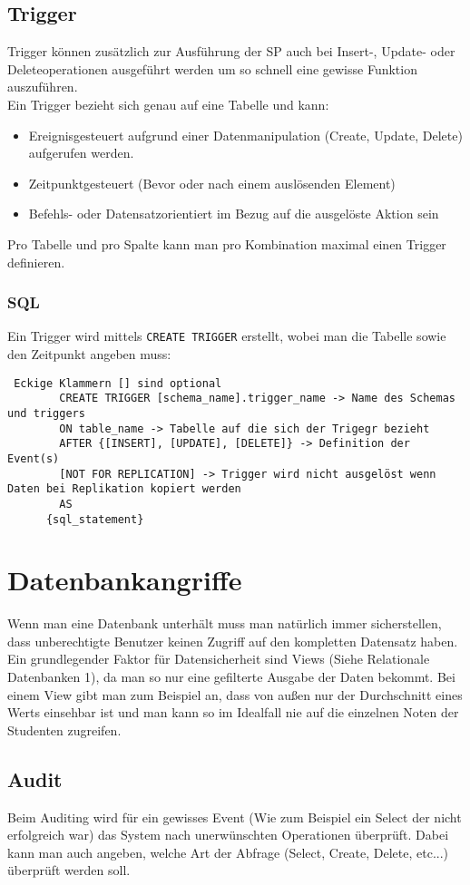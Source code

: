 \documentclass{article}
\begin{document}
	 \subsection{Trigger}
	 Trigger können zusätzlich zur Ausführung der SP auch bei Insert-, Update- oder Deleteoperationen ausgeführt werden um so schnell eine gewisse Funktion auszuführen. \\
	 Ein Trigger bezieht sich genau auf eine Tabelle und kann:
	 \begin{itemize}
	  	\item{Ereignisgesteuert aufgrund einer Datenmanipulation (Create, Update, Delete) aufgerufen werden.}
	  	\item{Zeitpunktgesteuert (Bevor oder nach einem auslösenden Element)}
	  	\item{Befehls- oder Datensatzorientiert im Bezug auf die ausgelöste Aktion sein}
	  \end{itemize} 
	  Pro Tabelle und pro Spalte kann man pro Kombination maximal einen Trigger definieren. \\
	  \subsubsection{SQL}
	  Ein Trigger wird mittels \texttt{CREATE TRIGGER} erstellt, wobei man die Tabelle sowie den Zeitpunkt angeben muss:
	\begin{verbatim} Eckige Klammern [] sind optional
		CREATE TRIGGER [schema_name].trigger_name -> Name des Schemas und triggers
		ON table_name -> Tabelle auf die sich der Trigegr bezieht
		AFTER {[INSERT], [UPDATE], [DELETE]} -> Definition der Event(s)
		[NOT FOR REPLICATION] -> Trigger wird nicht ausgelöst wenn Daten bei Replikation kopiert werden
		AS
	  {sql_statement}
	\end{verbatim}
	\section{Datenbankangriffe}
	Wenn man eine Datenbank unterhält muss man natürlich immer sicherstellen, dass unberechtigte Benutzer keinen Zugriff auf den kompletten Datensatz haben. Ein grundlegender Faktor für Datensicherheit sind Views (Siehe Relationale Datenbanken 1), da man so nur eine gefilterte Ausgabe der Daten bekommt. Bei einem View gibt man zum Beispiel an, dass von außen nur der Durchschnitt eines Werts einsehbar ist und man kann so im Idealfall nie auf die einzelnen Noten der Studenten zugreifen.
	\subsection{Audit}
	Beim Auditing wird für ein gewisses Event (Wie zum Beispiel ein Select der nicht erfolgreich war) das System nach unerwünschten Operationen überprüft. Dabei kann man auch angeben, welche Art der Abfrage (Select, Create, Delete, etc...) überprüft werden soll.
\end{document}
